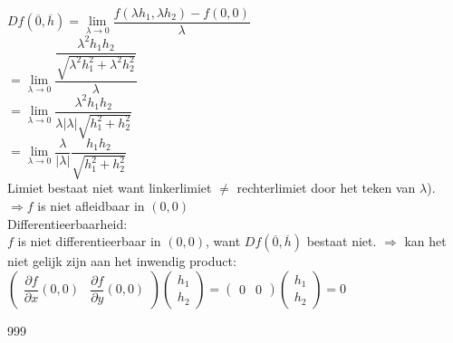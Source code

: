 \documentclass[a4paper]{article}
\newcommand{\dlim}{\lim\limits}
\begin{document}
$Df(\overline{0}, \overline{h}) = \dlim_{\lambda \rightarrow 0} \dfrac{f(\lambda h_1, \lambda h_2) - f(0,0)}{\lambda}$\\

$= \dlim_{\lambda \rightarrow 0} \dfrac{\dfrac{\lambda^2 h_1 h_2}{\sqrt{\lambda^2 h_1^2 + \lambda^2 h_2^2}}}{\lambda}$\\

$= \dlim_{\lambda \rightarrow 0} \dfrac{\lambda^2 h_1 h_2}{\lambda |\lambda| \sqrt{h_1^2 + h_2^2}}$\\

$= \dlim_{\lambda \rightarrow 0} \dfrac{\lambda}{|\lambda|} \dfrac{h_1 h_2}{\sqrt{h_1^2 + h_2^2}}$\\

Limiet bestaat niet want linkerlimiet $\neq$ rechterlimiet door het teken van $\lambda$).\\

$\Rightarrow f$ is niet afleidbaar in $(0,0)$\\

Differentieerbaarheid:\\

$f$ is niet differentieerbaar in $(0,0)$, want $Df(\overline{0}, \overline{h})$ bestaat niet. $\Rightarrow$ kan het niet gelijk zijn aan het inwendig product: \\

$\begin{pmatrix} 
\dfrac{\partial f}{\partial x}(0,0) & \dfrac{\partial f}{\partial y}(0,0) 
\end{pmatrix}
\begin{pmatrix} 
h_1 \\
h_2 
\end{pmatrix} 
= \begin{pmatrix} 
0 & 0 
\end{pmatrix} 
\begin{pmatrix} h_1 \\
h_2 
\end{pmatrix} 
= 0$\\

\begin{thebibliography}{999}
\end{thebibliography}
\end{document}
